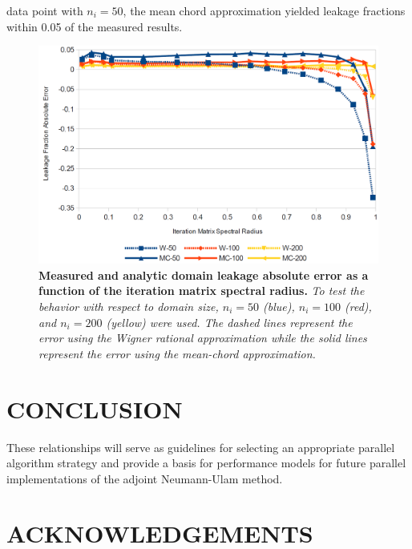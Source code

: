 \documentclass{mc2013}
\begin{document}
 data point with $n_i=50$, the mean chord approximation yielded
 leakage fractions within 0.05 of the measured results.
\vspace{16pt}
\begin{figure}[ht!]
\begin{spacing}{1.0}
  \begin{center}
    \includegraphics[width=5in,clip]{leakage_error.png}
  \end{center}
  \caption{\textbf{Measured and analytic domain leakage absolute error
      as a function of the iteration matrix spectral radius.}
    \textit{To test the behavior with respect to domain size, $n_i=50$
      (blue), $n_i=100$ (red), and $n_i=200$ (yellow) were used. The
      dashed lines represent the error using the Wigner rational
      approximation while the solid lines represent the error using
      the mean-chord approximation.}}
  \label{fig:leakage_error}
\end{spacing}
\end{figure}
\vspace{16pt}

\section{CONCLUSION}

These relationships will serve as guidelines for selecting an
appropriate parallel algorithm strategy and provide a basis for
performance models for future parallel implementations of the adjoint
Neumann-Ulam method.

\section*{ACKNOWLEDGEMENTS}
\end{document}
